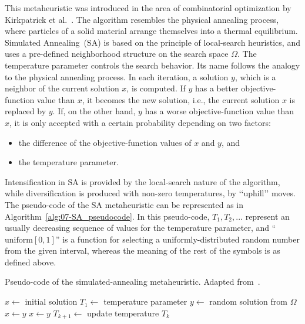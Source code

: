 This metaheuristic was introduced in the area of combinatorial optimization
by Kirkpatrick et al.~\cite{Kirkpatrick_OptimizationBySimulatesAnnealing}.
The algorithm resembles the physical annealing process, where particles
of a solid material arrange themselves into a thermal equilibrium.
Simulated Annealing~(SA)
is based on the principle of local-search heuristics, and uses a pre-defined
neighborhood structure on the search space $\Omega$. The temperature
parameter controls the search behavior. Its name follows the analogy
to the physical annealing process. In each iteration, a solution $y$,
which is a neighbor of the current solution $x$, is computed. If
$y$ has a better objective-function value than $x$, it becomes the
new solution, i.e., the current solution $x$ is replaced by $y$.
If, on the other hand, $y$ has a worse objective-function value than
$x$, it is only accepted with a certain probability depending on
two factors: 
\begin{itemize}
\item the difference of the objective-function values of $x$ and $y$,
and
\item the temperature parameter. 
\end{itemize}
Intensification in SA is provided by the local-search nature of the
algorithm, while diversification is produced with non-zero temperatures,
by \textquoteleft{}\textquoteleft{}uphill\textquoteright{}\textquoteright{}
moves. The pseudo-code of the SA metaheuristic can be represented
as in Algorithm~\ref{alg:07-SA_pseudocode}. In this pseudo-code,
$T_{1},T_{2},...$ represent an usually decreasing sequence of values
for the temperature parameter, and ``$\mathrm{{uniform}[0,1]}$''
is a function for selecting a uniformly-distributed random number
from the given interval, whereas the meaning of the rest of the symbols
is as defined above.

\begin{algorithm}
\centering

\caption{Pseudo-code of the simulated-annealing metaheuristic. Adapted from~\cite{Bianchi-A_survey_on_metaheuristics_for_stachastic_combinatorial_optimization:2009}.\textit{\label{alg:07-SA_pseudocode}}}


\begin{algorithmic}
\Require $x \gets$ initial solution
\Require $T_{\mathrm{1}} \gets$ temperature parameter
	\State $y \gets$ random solution from $\Omega$
		\State $x \gets y$
		\State $x \gets y$
	\EndIf
	\State $T_{k+1} \gets$ update temperature $T_{k}$
\EndFor
\end{algorithmic}
\end{algorithm}


